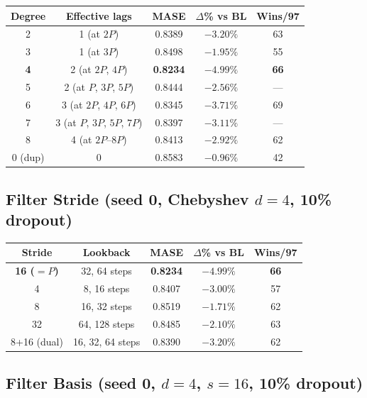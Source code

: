 \documentclass[11pt]{article}
\begin{document}
\begin{table}[h]
\centering
\small
\begin{tabular}{ccccc}
\toprule
\textbf{Degree} & \textbf{Effective lags} & \textbf{MASE} & \textbf{$\Delta$\% vs BL} & \textbf{Wins/97} \\
\midrule
2 & 1 (at $2P$) & 0.8389 & $-3.20\%$ & 63 \\
3 & 1 (at $3P$) & 0.8498 & $-1.95\%$ & 55 \\
\textbf{4} & 2 (at $2P$, $4P$) & \textbf{0.8234} & $-4.99\%$ & \textbf{66} \\
5 & 2 (at $P$, $3P$, $5P$) & 0.8444 & $-2.56\%$ & --- \\
6 & 3 (at $2P$, $4P$, $6P$) & 0.8345 & $-3.71\%$ & 69 \\
7 & 3 (at $P$, $3P$, $5P$, $7P$) & 0.8397 & $-3.11\%$ & --- \\
8 & 4 (at $2P$--$8P$) & 0.8413 & $-2.92\%$ & 62 \\
0 (dup) & 0 & 0.8583 & $-0.96\%$ & 42 \\
\bottomrule
\end{tabular}
\end{table}

\subsection{Filter Stride (seed 0, Chebyshev $d=4$, 10\% dropout)}

\begin{table}[h]
\centering
\small
\begin{tabular}{ccccc}
\toprule
\textbf{Stride} & \textbf{Lookback} & \textbf{MASE} & \textbf{$\Delta$\% vs BL} & \textbf{Wins/97} \\
\midrule
\textbf{16 ($=P$)} & 32, 64 steps & \textbf{0.8234} & $-4.99\%$ & \textbf{66} \\
4 & 8, 16 steps & 0.8407 & $-3.00\%$ & 57 \\
8 & 16, 32 steps & 0.8519 & $-1.71\%$ & 62 \\
32 & 64, 128 steps & 0.8485 & $-2.10\%$ & 63 \\
8+16 (dual) & 16, 32, 64 steps & 0.8390 & $-3.20\%$ & 62 \\
\bottomrule
\end{tabular}
\end{table}

\subsection{Filter Basis (seed 0, $d=4$, $s=16$, 10\% dropout)}
\end{document}
